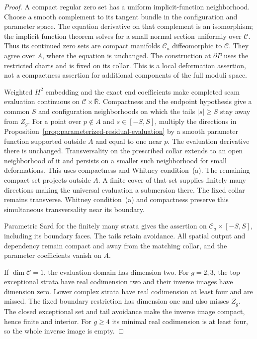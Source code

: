 \documentclass[11pt]{amsart}
\theoremstyle{definition}
\theoremstyle{remark}
\theoremstyle{plain}
\newcommand{\RR}{\mathbb{R}}
\newcommand{\cC}{\mathcal{C}}
\begin{document}
\begin{proof}
A compact regular zero set has a uniform implicit-function
neighborhood. Choose a smooth complement to its tangent bundle
in the configuration and parameter space. The equation
derivative on that complement is an isomorphism; the implicit
function theorem solves for a small normal section uniformly
over $\cC$. Thus its continued zero sets are compact manifolds
$\cC_a$ diffeomorphic to $\cC$. They agree over $A$, where
the equation is unchanged. The construction at $\partial P$
uses the restricted charts and is fixed on its collar.
This is a local deformation assertion, not a compactness
assertion for additional components of the full moduli space.

Weighted $H^2$ embedding and the exact end coefficients make
completed seam evaluation continuous on
$\cC\times\overline{\RR}$. Compactness and the endpoint
hypothesis give a common $S$ and configuration neighborhoods
on which the tails $|s|\geq S$ stay away from $Z_g$.
For a point over $p\notin A$ and $s\in[-S,S]$, multiply
the directions in
Proposition~\ref{prop:parameterized-residual-evaluation}
by a smooth parameter function supported outside $A$ and
equal to one near $p$. The evaluation derivative there
is unchanged. Transversality on the prescribed collar extends
to an open neighborhood of it and persists on a smaller such
neighborhood for small deformations. This uses compactness
and Whitney condition~(a). The remaining compact set projects
outside $A$. A finite cover of that set
supplies finitely many directions making the universal
evaluation a submersion there. The fixed collar remains
transverse. Whitney condition~(a) and compactness preserve
this simultaneous transversality near its boundary.

Parametric Sard for the finitely many strata gives the
assertion on $\cC_a\times[-S,S]$, including its boundary
faces. The tails retain avoidance. All spatial output and
dependency remain compact and away from the matching collar,
and the parameter coefficients vanish on $A$.

If $\dim\cC=1$, the evaluation domain has dimension two.
For $g=2,3$, the top exceptional strata have real codimension
two and their inverse images have dimension zero. Lower
complex strata have real codimension at least four and are
missed. The fixed boundary restriction has dimension one
and also misses $Z_g$. The closed exceptional set and
tail avoidance make the inverse image compact, hence finite
and interior. For $g\geq4$ its minimal real codimension is
at least four, so the whole inverse image is empty.
\end{proof}
\end{document}
